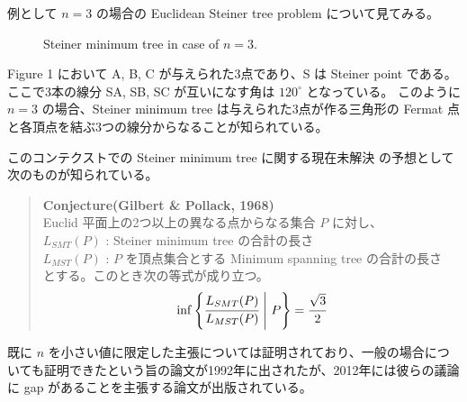 \documentclass[12pt,uplatex,dvipdfmx,titlepage]{article}
\theoremstyle{case}
\begin{document}
    例として $n=3$ の場合の Euclidean Steiner tree problem について見てみる。

    \begin{figure}[ht]
        \centering
        \caption{Steiner minimum tree in case of $n=3$.}
    \end{figure}
    Figure 1 において A, B, C が与えられた3点であり、S は Steiner point である。
    ここで3本の線分 SA, SB, SC が互いになす角は $120^\circ$ となっている。
    このように $n=3$ の場合、Steiner minimum tree は与えられた3点が作る三角形の Fermat 点と各頂点を結ぶ3つの線分からなることが知られている。

    このコンテクストでの Steiner minimum tree に関する現在未解決
    の予想として次のものが知られている。

    \begin{quote}
        {\bf Conjecture(Gilbert \& Pollack, 1968)}\\
        Euclid 平面上の2つ以上の異なる点からなる集合 $P$ に対し、\\
        \hspace{15pt} $L_{SMT}(P)$ : Steiner minimum tree の合計の長さ \\
        \hspace{15pt} $L_{MST}(P)$ : $P$ を頂点集合とする Minimum spanning tree の合計の長さ\\
        とする。このとき次の等式が成り立つ。
        \begin{eqnarray*}
            \inf\left\{\cfrac{L_{SMT}(P)}{L_{MST}(P)}\ \middle|\ P \right\}=\cfrac{\sqrt{3}}{2} \\
        \end{eqnarray*}
    \end{quote}
    既に $n$ を小さい値に限定した主張については証明されており、一般の場合についても証明できたという旨の論文\cite{rat}が1992年に出されたが、2012年には彼らの議論に gap があることを主張する論文\cite{rat2}が出版されている。
\end{document}
